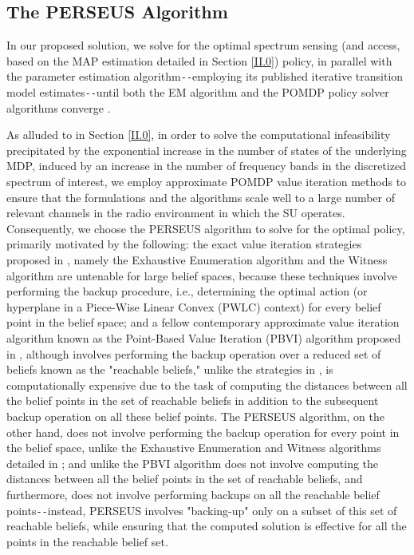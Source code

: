 \documentclass[12pt, draftcls, onecolumn]{IEEEtran}
\begin{document}
\subsection{The PERSEUS Algorithm}\label{II.II}
In our proposed solution, we solve for the optimal spectrum sensing (and access, based on the MAP estimation detailed in Section \ref{II.0}) policy, in parallel with the parameter estimation algorithm\texttt{-{}-}employing its published iterative transition model estimates\texttt{-{}-}until both the EM algorithm and the POMDP policy solver algorithms converge .

As alluded to in Section \ref{II.0}, in order to solve the computational infeasibility precipitated by the exponential increase in the number of states of the underlying MDP, induced by an increase in the number of frequency bands in the discretized spectrum of interest, we employ approximate POMDP value iteration methods to ensure that the formulations and the algorithms scale well to a large number of relevant channels in the radio environment in which the SU operates. Consequently, we choose the PERSEUS algorithm \cite{WCL:13} to solve for the optimal policy, primarily motivated by the following: the exact value iteration strategies proposed in \cite{PUOccupancy:18}, namely the Exhaustive Enumeration algorithm and the Witness algorithm are untenable for large belief spaces, because these techniques involve performing the backup procedure, i.e., determining the optimal action (or hyperplane in a Piece-Wise Linear Convex (PWLC) context) for every belief point in the belief space; and a fellow contemporary approximate value iteration algorithm known as the Point-Based Value Iteration (PBVI) algorithm proposed in \cite{PUOccupancy:17}, although involves performing the backup operation over a reduced set of beliefs known as the "reachable beliefs," unlike the strategies in \cite{PUOccupancy:17}, is computationally expensive due to the task of computing the distances between all the belief points in the set of reachable beliefs in addition to the subsequent backup operation on all these belief points. The PERSEUS algorithm, on the other hand, does not involve performing the backup operation for every point in the belief space, unlike the Exhaustive Enumeration and Witness algorithms detailed in \cite{PUOccupancy:18}; and unlike the PBVI algorithm \cite{PUOccupancy:17} does not involve computing the distances between all the belief points in the set of reachable beliefs, and furthermore, does not involve performing backups on all the reachable belief points\texttt{-{}-}instead, PERSEUS involves "backing-up" only on a subset of this set of reachable beliefs, while ensuring that the computed solution is effective for all the points in the reachable belief set.
\end{document}
